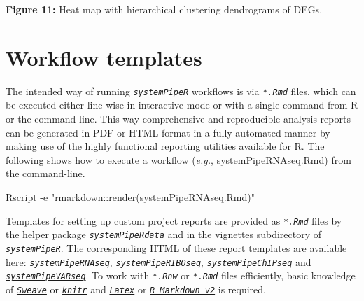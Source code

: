 \documentclass[14pt,]{article}
\newcommand{\hlstr}[1]{\textcolor[rgb]{0.251,0.627,0.251}{#1}}%
\newcommand{\hlstd}[1]{\textcolor[rgb]{0.251,0.251,0.251}{#1}}%
\newenvironment{Shaded}{\begin{myshaded}}{\end{myshaded}}
\newcommand{\StringTok}[1]{\hlstr{#1}}
\newcommand{\ExtensionTok}[1]{{#1}}
\newcommand{\NormalTok}[1]{\hlstd{#1}}
\begin{document}
\textbf{Figure 11:} Heat map with hierarchical clustering dendrograms of DEGs.

\hypertarget{workflow-templates}{%
\section{Workflow templates}\label{workflow-templates}}

The intended way of running \emph{\texttt{systemPipeR}} workflows is via \emph{\texttt{*.Rmd}} files, which
can be executed either line-wise in interactive mode or with a single command from
R or the command-line. This way comprehensive and reproducible analysis reports
can be generated in PDF or HTML format in a fully automated manner by making use
of the highly functional reporting utilities available for R.
The following shows how to execute a workflow (\emph{e.g.}, systemPipeRNAseq.Rmd)
from the command-line.

\begin{Shaded}
\begin{Highlighting}[]
\ExtensionTok{Rscript}\NormalTok{ {-}e }\StringTok{"rmarkdown::render(\textquotesingle{}systemPipeRNAseq.Rmd\textquotesingle{})"}
\end{Highlighting}
\end{Shaded}

Templates for setting up custom project reports are provided as \emph{\texttt{*.Rmd}} files by the helper package \emph{\texttt{systemPipeRdata}} and in the vignettes subdirectory of \emph{\texttt{systemPipeR}}. The corresponding HTML of these report templates are available here: \href{http://www.bioconductor.org/packages/devel/data/experiment/vignettes/systemPipeRdata/inst/doc/systemPipeRNAseq.html}{\emph{\texttt{systemPipeRNAseq}}}, \href{http://www.bioconductor.org/packages/devel/data/experiment/vignettes/systemPipeRdata/inst/doc/systemPipeRIBOseq.html}{\emph{\texttt{systemPipeRIBOseq}}}, \href{http://www.bioconductor.org/packages/devel/data/experiment/vignettes/systemPipeRdata/inst/doc/systemPipeChIPseq.html}{\emph{\texttt{systemPipeChIPseq}}} and \href{http://www.bioconductor.org/packages/devel/data/experiment/vignettes/systemPipeRdata/inst/doc/systemPipeVARseq.html}{\emph{\texttt{systemPipeVARseq}}}. To work with \emph{\texttt{*.Rnw}} or \emph{\texttt{*.Rmd}} files efficiently, basic knowledge of \href{https://www.stat.uni-muenchen.de/~leisch/Sweave/}{\emph{\texttt{Sweave}}} or \href{http://yihui.name/knitr/}{\emph{\texttt{knitr}}} and \href{http://www.latex-project.org/}{\emph{\texttt{Latex}}} or \href{http://rmarkdown.rstudio.com/}{\emph{\texttt{R Markdown v2}}} is required.
\end{document}
